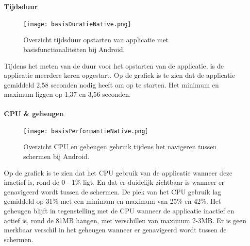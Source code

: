 \paragraph{Tijdsduur}
\begin{figure}[H]
    \centering
    \texttt{[image: basisDuratieNative.png]}
    \caption{Overzicht tijdsduur opstarten van applicatie met basisfunctionaliteiten bij Android.}
\end{figure}
Tijdens het meten van de duur voor het opstarten van de applicatie, 
is de applicatie meerdere keren opgestart. Op de grafiek is te zien dat de applicatie
gemiddeld 2,58 seconden nodig heeft om op te starten. Het minimum en maximum 
liggen op 1,37 en 3,56 seconden.

\paragraph{CPU \& geheugen}
\begin{figure}[H]
    \centering
    \texttt{[image: basisPerformantieNative.png]}
    \caption{Overzicht CPU en geheugen gebruik tijdens het navigeren tussen schermen bij Android.}
\end{figure}
Op de grafiek is te zien dat het CPU gebruik van de applicatie wanneer deze 
inactief is, rond de 0 - 1\% ligt. En dat er duidelijk zichtbaar is wanneer er
genavigeerd wordt tussen de schermen. De piek van het CPU gebruik lag gemiddeld
op 31\% met een minimum en maximum van 25\% en 42\%. Het geheugen blijft in tegenstelling
met de CPU wanneer de applicatie inactief en actief is, rond de 81MB hangen, met
verschillen van maximum 2-3MB. Er is geen merkbaar verschil in het geheugen wanneer
er genavigeerd wordt tussen de schermen.

